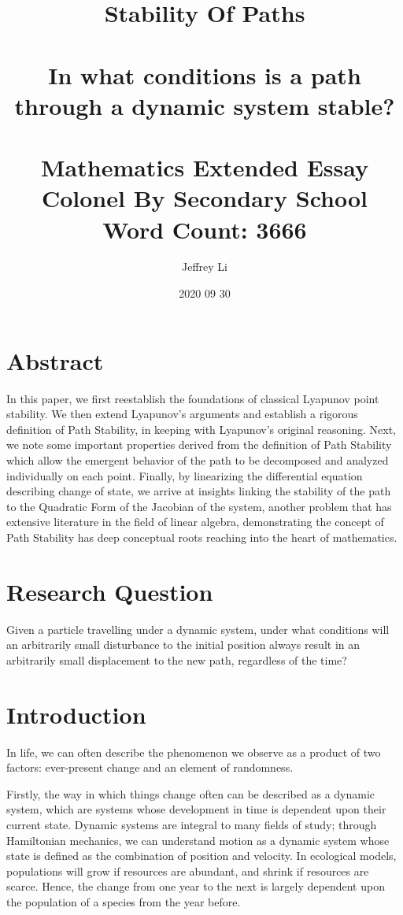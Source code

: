\documentclass{article}
\title{
  {\LARGE
   \textbf{Stability Of Paths}
   }\\~\\
   {\large
    \textbf{In what conditions is a path through a dynamic system stable?}
   }\\~\\
  {\large Mathematics Extended Essay}\\
  {\large Colonel By Secondary School} \\
  {\large Word Count: 3666}
}
\author{Jeffrey Li}
\date{2020 09 30}
\theoremstyle{definition}
\theoremstyle{remark}
\begin{document}
\maketitle
\break

\section*{Abstract}
In this paper, we first reestablish the foundations of classical
Lyapunov point stability. We then extend Lyapunov's arguments
and establish a rigorous definition of Path Stability, in keeping 
with Lyapunov's original reasoning. Next, we note some important 
properties derived from the definition of Path Stability which 
allow the emergent behavior of the path to be decomposed and 
analyzed individually on each point. Finally, by linearizing
the differential equation describing change of state, we arrive at insights
linking the stability of the path to the Quadratic Form of
the Jacobian of the system, another problem that has extensive 
literature in the field of linear algebra, demonstrating
the concept of Path Stability has deep conceptual roots
reaching into the heart of mathematics.

\break

\tableofcontents
\break


\section{Research Question}
Given a particle travelling under a dynamic system, 
under what conditions will an arbitrarily small disturbance to the initial 
position always result in an arbitrarily small displacement to the new path,
regardless of the time? 

\section{Introduction}
In life, we can often describe the phenomenon we observe as a product of two factors:
ever-present change and an element of randomness.

Firstly, the way in which things change often can be described as a dynamic system,
which are systems whose development in time is dependent upon their current state. Dynamic systems are integral to 
many fields of study; through Hamiltonian mechanics, we can understand motion
as a dynamic system whose state is defined as the combination of position and velocity.
In ecological models, populations will grow if resources are abundant, and shrink if
resources are scarce. Hence, the change from one year to the next is largely dependent
upon the population of a species from the year before. 
\end{document}
